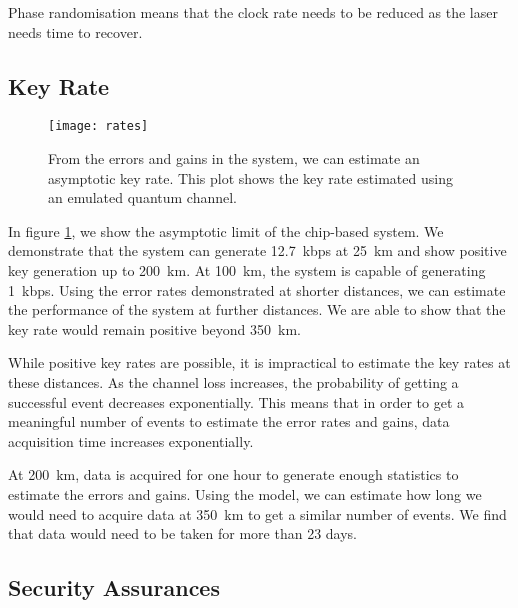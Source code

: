 Phase randomisation means that the clock rate needs to be reduced as the laser needs time to recover. 

\subsection{Key Rate}

\begin{figure}
	\centering
	\texttt{[image: rates]}
	\caption[Asymptotic key rates of chip-based MDI-QKD]{From the errors and gains in the system, we can estimate an asymptotic key rate. This plot shows the key rate estimated using an emulated quantum channel.}
	\label{fig:mdi_rates}
\end{figure}

In figure \ref{fig:mdi_rates}, we show the asymptotic limit of the chip-based system. We demonstrate that the system can generate \SI{12.7}{kbps} at \SI{25}{\km} and show positive key generation up to \SI{200}{\km}. At \SI{100}{\km}, the system is capable of generating \SI{1}{kbps}. Using the error rates demonstrated at shorter distances, we can estimate the performance of the system at further distances. We are able to show that the key rate would remain positive beyond \SI{350}{\km}.

While positive key rates are possible, it is impractical to estimate the key rates at these distances. As the channel loss increases, the probability of getting a successful event decreases exponentially. This means that in order to get a meaningful number of events to estimate the error rates and gains, data acquisition time increases exponentially. 

At \SI{200}{\km}, data is acquired for one hour to generate enough statistics to estimate the errors and gains. Using the model, we can estimate how long we would need to acquire data at \SI{350}{\km} to get a similar number of events. We find that data would need to be taken for more than 23 days. 

%

\subsection{Security Assurances}

